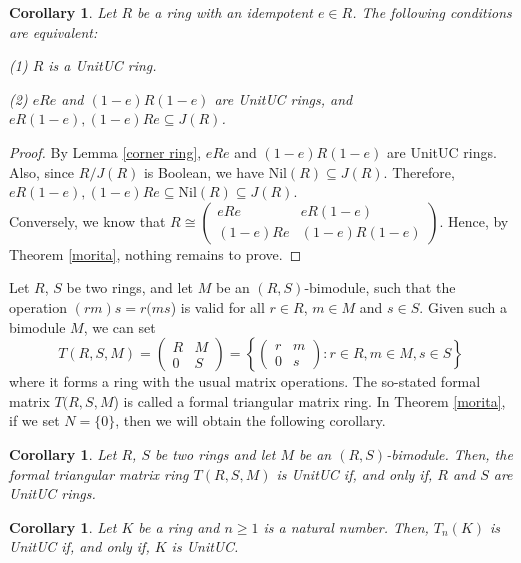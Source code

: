 \documentclass[12pt]{amsart}
\newtheorem{corollary}[theorem]{Corollary}
\theoremstyle{definition}
\begin{document}
\begin{corollary}
Let $R$ be a ring with an idempotent $e \in R$. The following conditions are equivalent:

(1) $R$ is a   UnitUC ring.

(2) $eRe$ and $(1 - e)R(1 - e)$ are   UnitUC rings, and $eR(1 - e),(1 - e)Re \subseteq J(R)$.

\end{corollary}
\begin{proof}
    By Lemma \ref{corner ring}, $eRe$ and $(1-e)R(1-e)$ are   UnitUC rings. Also, since $R/J(R)$ is Boolean, we have $\text{Nil}(R) \subseteq J(R)$. Therefore, $eR(1-e), (1-e)Re \subseteq \text{Nil}(R) \subseteq J(R)$.\\ Conversely, we know that $R \cong \begin{pmatrix}
        eRe & eR(1-e) \\ (1-e)Re & (1-e)R(1-e)
    \end{pmatrix}$. Hence, by Theorem \ref{morita}, nothing remains to prove.
\end{proof}

Let $R$, $S$ be two rings, and let $M$ be an $(R, S)$-bimodule, such that the operation $(rm)s = r(ms$) is valid for all $r \in R$, $m \in M$ and $s \in S$. Given such a bimodule $M$, we can set
$$
T(R, S, M) =
\begin{pmatrix}
 R& M \\
 0& S
\end{pmatrix} 
=
\left\{  
\begin{pmatrix}
 r& m \\
 0& s
\end{pmatrix} 
: r \in R, m \in M, s \in S
\right\}
$$
where it forms a ring with the usual matrix operations. The so-stated formal matrix $T(R, S, M$) is called a formal triangular matrix ring. In Theorem \ref{morita}, if we set $N =\{0\}$, then we will obtain the following corollary.


\begin{corollary} \label{formal tringular matrix}
Let $R$, $S$ be two rings and let $M$ be an $(R, S)$-bimodule. Then, the formal triangular matrix ring $T(R, S, M)$ is   UnitUC if, and only if, $R$ and $S$ are   UnitUC rings.
\end{corollary}

\begin{corollary}
Let $K$ be a ring and $n \ge 1$ is a natural number. Then, $T_n(K)$ is   UnitUC if, and only if,  $K$ is   UnitUC.
\end{corollary}
\end{document}

